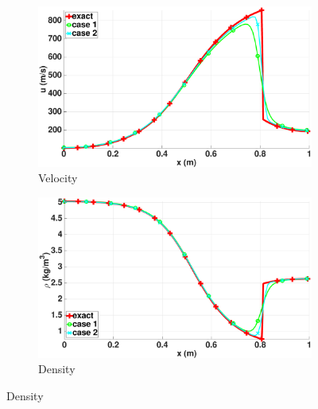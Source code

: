 %
\begin{figure}[H]
        \centering
        \begin{subfigure}[b]{0.5\textwidth}
                \centering
                \includegraphics[width=\textwidth]{figures/vapor_velocity_llf_and_exact_100.eps}
                \caption{Velocity}
                \label{fig:vap-phase-vel}
        \end{subfigure}%
        \begin{subfigure}[b]{0.5\textwidth}
                \centering
                \includegraphics[width=\textwidth]{figures/vapor_density_llf_and_exact_100.eps}
                \caption{Density}
                \label{fig:vap-phase-density}
        \end{subfigure}
        

\end{figure}
